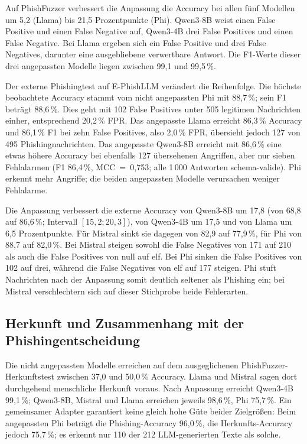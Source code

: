 \documentclass[12pt,twoside=false,a4paper,parskip]{scrbook}
\begin{document}
Auf PhishFuzzer verbessert die Anpassung die Accuracy bei allen fünf Modellen um 5{,}2 (Llama) bis 21{,}5 Prozentpunkte (Phi). Qwen3-8B weist einen False Positive und einen False Negative auf, Qwen3-4B drei False Positives und einen False Negative. Bei Llama ergeben sich ein False Positive und drei False Negatives, darunter eine ausgebliebene verwertbare Antwort. Die F1-Werte dieser drei angepassten Modelle liegen zwischen 99{,}1 und 99{,}5\,\%.

Der externe Phishingtest auf E-PhishLLM verändert die Reihenfolge. Die höchste beobachtete Accuracy stammt vom nicht angepassten Phi mit 88{,}7\,\%; sein F1 beträgt 88{,}6\,\%. Dies geht mit 102 False Positives unter 505 legitimen Nachrichten einher, entsprechend 20{,}2\,\% FPR. Das angepasste Llama erreicht 86{,}3\,\% Accuracy und 86{,}1\,\% F1 bei zehn False Positives, also 2{,}0\,\% FPR, übersieht jedoch 127 von 495 Phishingnachrichten. Das angepasste Qwen3-8B erreicht mit 86{,}6\,\% eine etwas höhere Accuracy bei ebenfalls 127 übersehenen Angriffen, aber nur sieben Fehlalarmen (F1 86{,}4\,\%, MCC~=~0{,}753; alle 1\,000 Antworten schema-valide). Phi erkennt mehr Angriffe; die beiden angepassten Modelle verursachen weniger Fehlalarme.

Die Anpassung verbessert die externe Accuracy von Qwen3-8B um 17{,}8 (von 68{,}8 auf 86{,}6\,\%; Intervall $[15{,}2;20{,}3]$), von Qwen3-4B um 17{,}5 und von Llama um 6{,}5 Prozentpunkte. Für Mistral sinkt sie dagegen von 82{,}9 auf 77{,}9\,\%, für Phi von 88{,}7 auf 82{,}0\,\%. Bei Mistral steigen sowohl die False Negatives von 171 auf 210 als auch die False Positives von null auf elf. Bei Phi sinken die False Positives von 102 auf drei, während die False Negatives von elf auf 177 steigen. Phi stuft Nachrichten nach der Anpassung somit deutlich seltener als Phishing ein; bei Mistral verschlechtern sich auf dieser Stichprobe beide Fehlerarten.

\subsection{Herkunft und Zusammenhang mit der Phishingentscheidung}\label{sec:herkunft-ergebnisse}

Die nicht angepassten Modelle erreichen auf dem ausgeglichenen PhishFuzzer-Herkunftstest zwischen 37{,}0 und 50{,}0\,\% Accuracy. Llama und Mistral sagen dort durchgehend menschliche Herkunft voraus. Nach Anpassung erreicht Qwen3-4B 99{,}1\,\%; Qwen3-8B, Mistral und Llama erreichen jeweils 98{,}6\,\%, Phi 75{,}7\,\%. Ein gemeinsamer Adapter garantiert keine gleich hohe Güte beider Zielgrößen: Beim angepassten Phi beträgt die Phishing-Accuracy 96{,}0\,\%, die Herkunfts-Accuracy jedoch 75{,}7\,\%; es erkennt nur 110 der 212 LLM-generierten Texte als solche.
\end{document}
